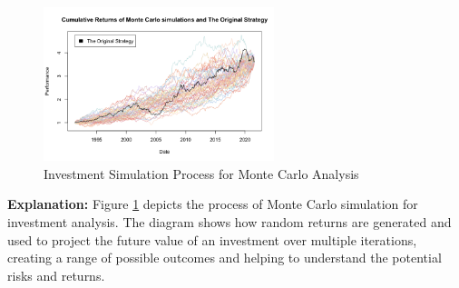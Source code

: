 \begin{figure}[h!]
    \centering
    \includegraphics[width=0.6\textwidth]{../Figures/investment_simulation_process.png}
    \caption{Investment Simulation Process for Monte Carlo Analysis}
    \label{fig:investment_simulation}
\end{figure}

\textbf{Explanation:} Figure \ref{fig:investment_simulation} depicts the process of Monte Carlo simulation for investment analysis. The diagram shows how random returns are generated and used to project the future value of an investment over multiple iterations, creating a range of possible outcomes and helping to understand the potential risks and returns.

\newpage
